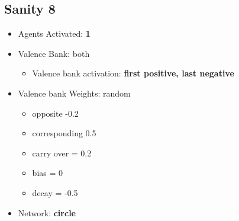 \documentclass{article}\usepackage[]{graphicx}\usepackage[]{color}
\begin{document}
\subsection{Sanity 8}
\label{sec:sanity8}
\begin{itemize}
  \item Agents Activated: \textbf{1}
  \item Valence Bank: both
  \begin{itemize}
      \item Valence bank activation: \textbf{first positive, last negative}
  \end{itemize}
  \item Valence bank Weights: random
  \begin{itemize}
      \item opposite -0.2
      \item corresponding 0.5
      \item carry over = 0.2
      \item bias = 0
      \item decay = -0.5
  \end{itemize}
  \item Network: \textbf{circle}
\end{itemize}
\end{document}
